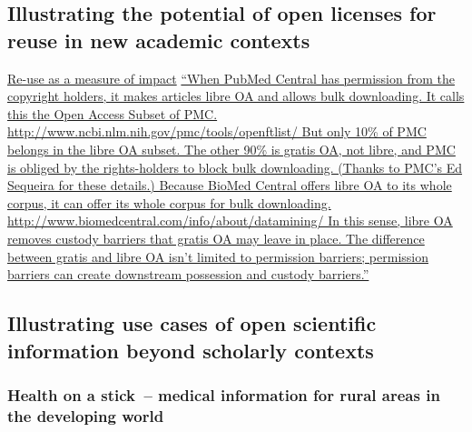 \documentclass[final,authoryear,3p]{elsarticle-open-drafting}
\begin{document}
\subsection{Illustrating the potential of open licenses for reuse in new academic contexts}
\href{http://altmetrics.org/workshop2011/neylon-v0/}{Re-use as a measure of impact}
\href{http://www.earlham.edu/~peters/fos/newsletter/06-02-11.htm}{``When PubMed Central has permission from the copyright holders, it makes articles libre OA and allows bulk downloading.  It calls this the Open Access Subset of PMC. 
http://www.ncbi.nlm.nih.gov/pmc/tools/openftlist/ But only 10\% of PMC belongs in the libre OA subset.  The other 90\% is gratis OA, not libre, and PMC is obliged by the rights-holders to block bulk downloading.  (Thanks to PMC's Ed Sequeira for these details.) Because BioMed Central offers libre OA to its whole corpus, it can offer its whole corpus for bulk downloading. 
http://www.biomedcentral.com/info/about/datamining/ In this sense, libre OA removes custody barriers that gratis OA may leave in place.  The difference between gratis and libre OA isn't limited to permission barriers; permission barriers can create downstream possession and custody barriers.''}

\subsection{Illustrating use cases of open scientific information beyond scholarly contexts}
\subsubsection[Health on a stick]{Health on a stick~-- medical information for rural areas in the developing world}
\label{section:healthonastick}
\end{document}
